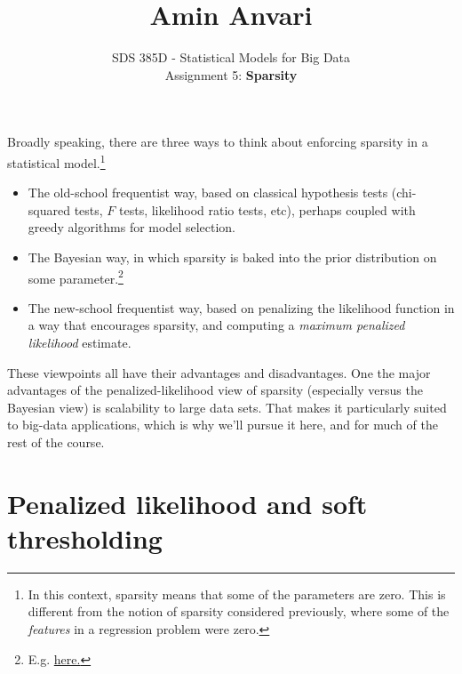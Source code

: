 \documentclass{article}
\title{Amin Anvari}
\date{}
\author{SDS 385D - Statistical Models for Big Data\\ Assignment 5: \textbf{Sparsity}}
\date{}  %
\begin{document}
\maketitle%

\bigskip


Broadly speaking, there are three ways to think about enforcing sparsity in a statistical model.\footnote{In this context, sparsity means that some of the parameters are zero.  This is different from the notion of sparsity considered previously, where some of the \textit{features} in a regression problem were zero.}
\begin{itemize}
\item The old-school frequentist way, based on classical hypothesis tests (chi-squared tests, $F$ tests, likelihood ratio tests, etc), perhaps coupled with greedy algorithms for model selection.
\item The Bayesian way, in which sparsity is baked into the prior distribution on some parameter.\footnote{E.g. \href{http://www-stat.wharton.upenn.edu/~edgeorge/Research_papers/fastN96.pdf}{here.}}
\item The new-school frequentist way, based on penalizing the likelihood function in a way that encourages sparsity, and computing a \textit{maximum penalized likelihood} estimate.
\end{itemize}

These viewpoints all have their advantages and disadvantages.  One the major advantages of the penalized-likelihood view of sparsity (especially versus the Bayesian view) is scalability to large data sets.  That makes it particularly suited to big-data applications, which is why we'll pursue it here, and for much of the rest of the course.

\section{Penalized likelihood and soft thresholding}
\end{document}
